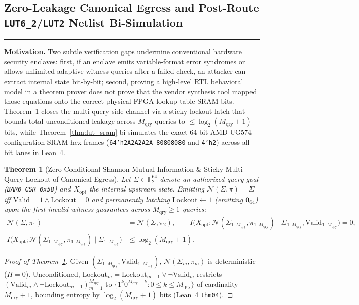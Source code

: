 \documentclass[10pt,twocolumn]{article}
\makeatletter
\newif\ifspecintwocol \specintwocolfalse
\newif\ifspecresume   \specresumefalse
\newcommand{\StopTwoCol}{%
  \if@twocolumn
    \onecolumn
    \global\specintwocolfalse
    \let\spec@next\@empty
  \else
    \ifspecintwocol
      \global\specintwocolfalse
      \def\spec@next{\end{multicols}}%
    \else
      \let\spec@next\@empty
    \fi
  \fi
  \spec@next
}
\newcommand{\BeginConnesPlate}{%
  \if@twocolumn
    \onecolumn
    \global\specresumetrue
    \let\spec@platepre\@empty
  \else
    \ifspecintwocol
      \global\specresumetrue
      \let\spec@platepre\StopTwoCol
    \else
      \global\specresumefalse
      \let\spec@platepre\@empty
    \fi
  \fi
  \spec@platepre
  \par\vspace{4pt}\noindent\textcolor{black!25}{\rule{\textwidth}{0.4pt}}\par\vspace{3pt}%
}
\theoremstyle{spectralthm}
\newtheorem{theorem}{Theorem}[section]
\makeatother
\begin{document}
\subsection{Zero-Leakage Canonical Egress and Post-Route \texorpdfstring{\texttt{LUT6\_2}/\texttt{LUT2}}{LUT6\_2 / LUT2} Netlist Bi-Simulation}
\BeginConnesPlate
\noindent\textbf{Motivation.}\; Two subtle verification gaps undermine conventional hardware security enclaves: first, if an enclave emits variable-format error syndromes or allows unlimited adaptive witness queries after a failed check, an attacker can extract internal state bit-by-bit; second, proving a high-level RTL behavioral model in a theorem prover does not prove that the vendor synthesis tool mapped those equations onto the correct physical FPGA lookup-table SRAM bits. Theorem~\ref{thm:egress} closes the multi-query side channel via a sticky lockout latch that bounds total unconditioned leakage across $M_{\mathrm{qry}}$ queries to $\le \log_2(M_{\mathrm{qry}}+1)$ bits, while Theorem~\ref{thm:lut_sram} bi-simulates the exact 64-bit AMD UG574 configuration SRAM hex frames (\texttt{64'h2A2A2A2A\_80808080} and \texttt{4'h2}) across all bit lanes in Lean~4.

\begin{theorem}[Zero Conditional Shannon Mutual Information \& Sticky Multi-Query Lockout of Canonical Egress]
\label{thm:egress}
Let $\Sigma \in \mathbb{F}_2^{64}$ denote an authorized query goal (\texttt{BAR0 CSR 0x58}) and $X_{\mathrm{opt}}$ the internal upstream state. Emitting $\mathcal{N}(\Sigma, \pi) = \Sigma$ iff $\mathrm{Valid} = 1 \wedge \mathrm{Lockout} = 0$ and permanently latching $\mathrm{Lockout} \leftarrow 1$ (emitting $\mathbf{0}_{64}$) upon the first invalid witness guarantees across $M_{\mathrm{qry}} \ge 1$ queries:
\begin{equation}
\label{eq:egress_mi}
\begin{aligned}
\mathcal{N}(\Sigma, \pi_1) &= \mathcal{N}(\Sigma, \pi_2),\qquad
I\bigl(X_{\mathrm{opt}}; \mathcal{N}(\Sigma_{1:M_{\mathrm{qry}}}, \pi_{1:M_{\mathrm{qry}}}) \;\big|\; \Sigma_{1:M_{\mathrm{qry}}}, \mathrm{Valid}_{1:M_{\mathrm{qry}}}\bigr) = 0,\\
I\bigl(X_{\mathrm{opt}}; \mathcal{N}(\Sigma_{1:M_{\mathrm{qry}}}, \pi_{1:M_{\mathrm{qry}}}) \;\big|\; \Sigma_{1:M_{\mathrm{qry}}}\bigr) &\le \log_2(M_{\mathrm{qry}} + 1).
\end{aligned}
\end{equation}
\end{theorem}
\begin{proof}[Proof of Theorem~\ref{thm:egress}]
Given $(\Sigma_{1:M_{\mathrm{qry}}}, \mathrm{Valid}_{1:M_{\mathrm{qry}}})$, $\mathcal{N}(\Sigma_m, \pi_m)$ is deterministic ($H = 0$). Unconditioned, $\mathrm{Lockout}_m = \mathrm{Lockout}_{m-1} \vee \neg\mathrm{Valid}_m$ restricts $(\mathrm{Valid}_m \wedge \neg\mathrm{Lockout}_{m-1})_{m=1}^{M_{\mathrm{qry}}}$ to $\{1^k 0^{M_{\mathrm{qry}}-k} : 0 \le k \le M_{\mathrm{qry}}\}$ of cardinality $M_{\mathrm{qry}}+1$, bounding entropy by $\log_2(M_{\mathrm{qry}}+1)$ bits (Lean~4 \texttt{thm04}).
\end{proof}
\end{document}
